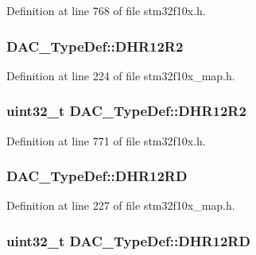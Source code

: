Definition at line 768 of file stm32f10x.\+h.

\subsubsection[{\texorpdfstring{D\+H\+R12\+R2}{DHR12R2}}]{ D\+A\+C\+\_\+\+Type\+Def\+::\+D\+H\+R12\+R2}\hypertarget{struct_d_a_c___type_def_abbead68762678e846edf7e562ef37e51}{}\label{struct_d_a_c___type_def_abbead68762678e846edf7e562ef37e51}


Definition at line 224 of file stm32f10x\+\_\+map.\+h.

\subsubsection[{\texorpdfstring{D\+H\+R12\+R2}{DHR12R2}}]{ {\bf uint32\+\_\+t} D\+A\+C\+\_\+\+Type\+Def\+::\+D\+H\+R12\+R2}\hypertarget{struct_d_a_c___type_def_ab1f777540c487c26bf27e6fa37a644cc}{}\label{struct_d_a_c___type_def_ab1f777540c487c26bf27e6fa37a644cc}


Definition at line 771 of file stm32f10x.\+h.

\subsubsection[{\texorpdfstring{D\+H\+R12\+RD}{DHR12RD}}]{ D\+A\+C\+\_\+\+Type\+Def\+::\+D\+H\+R12\+RD}\hypertarget{struct_d_a_c___type_def_af735a1f8ef419c0135d0da26a8df5180}{}\label{struct_d_a_c___type_def_af735a1f8ef419c0135d0da26a8df5180}


Definition at line 227 of file stm32f10x\+\_\+map.\+h.

\subsubsection[{\texorpdfstring{D\+H\+R12\+RD}{DHR12RD}}]{ {\bf uint32\+\_\+t} D\+A\+C\+\_\+\+Type\+Def\+::\+D\+H\+R12\+RD}\hypertarget{struct_d_a_c___type_def_affa5cc9fe0cc9eb594d703bdc9d9abd9}{}\label{struct_d_a_c___type_def_affa5cc9fe0cc9eb594d703bdc9d9abd9}


